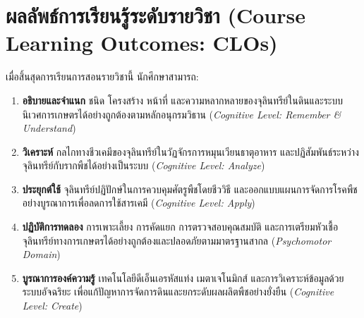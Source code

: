 \section*{ผลลัพธ์การเรียนรู้ระดับรายวิชา (Course Learning Outcomes: CLOs)}
เมื่อสิ้นสุดการเรียนการสอนรายวิชานี้ นักศึกษาสามารถ:
\begin{enumerate}[label=\textbf{CLO\arabic*:}]
    \item \textbf{อธิบายและจำแนก} ชนิด โครงสร้าง หน้าที่ และความหลากหลายของจุลินทรีย์ในดินและระบบนิเวศการเกษตรได้อย่างถูกต้องตามหลักอนุกรมวิธาน (\textit{Cognitive Level: Remember \& Understand})
    \item \textbf{วิเคราะห์} กลไกทางชีวเคมีของจุลินทรีย์ในวัฏจักรการหมุนเวียนธาตุอาหาร และปฏิสัมพันธ์ระหว่างจุลินทรีย์กับรากพืชได้อย่างเป็นระบบ (\textit{Cognitive Level: Analyze})
    \item \textbf{ประยุกต์ใช้} จุลินทรีย์ปฏิปักษ์ในการควบคุมศัตรูพืชโดยชีววิธี และออกแบบแผนการจัดการโรคพืชอย่างบูรณาการเพื่อลดการใช้สารเคมี (\textit{Cognitive Level: Apply})
    \item \textbf{ปฏิบัติการทดลอง} การเพาะเลี้ยง การคัดแยก การตรวจสอบคุณสมบัติ และการเตรียมหัวเชื้อจุลินทรีย์ทางการเกษตรได้อย่างถูกต้องและปลอดภัยตามมาตรฐานสากล (\textit{Psychomotor Domain})
    \item \textbf{บูรณาการองค์ความรู้} เทคโนโลยีดีเอ็นเอรหัสแท่ง เมตาเจโนมิกส์ และการวิเคราะห์ข้อมูลด้วยระบบอัจฉริยะ เพื่อแก้ปัญหาการจัดการดินและยกระดับผลผลิตพืชอย่างยั่งยืน (\textit{Cognitive Level: Create})
\end{enumerate}

